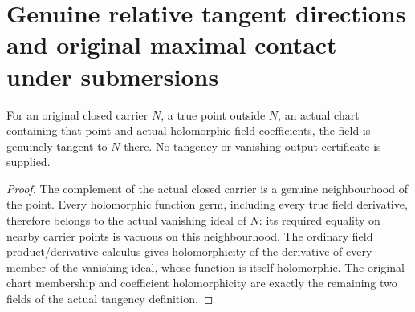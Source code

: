 \section{Genuine relative tangent directions and original maximal contact under submersions}

\begin{lemma}
\label{hir:submersion-tangent-contact-off-carrier-field}
\leanok
For an original closed carrier $N$, a true point outside $N$, an actual chart
containing that point and actual holomorphic field coefficients, the field is
genuinely tangent to $N$ there. No tangency or vanishing-output certificate is
supplied.
\end{lemma}
\begin{proof}
The complement of the actual closed carrier is a genuine neighbourhood of the
point. Every holomorphic function germ, including every true field derivative,
therefore belongs to the actual vanishing ideal of $N$: its required equality
on nearby carrier points is vacuous on this neighbourhood. The ordinary field
product/derivative calculus gives holomorphicity of the derivative of every
member of the vanishing ideal, whose function is itself holomorphic. The
original chart membership and coefficient holomorphicity are exactly the
remaining two fields of the actual tangency definition.
\end{proof}

